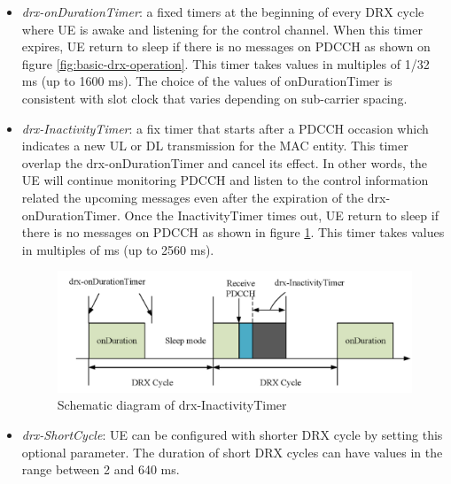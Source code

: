 \documentclass[conference]{IEEEtran}
\begin{document}
\begin{itemize}
    \item \textit{drx-onDurationTimer}: a fixed timers at the beginning of every DRX cycle where UE is awake and listening for the control channel. When this timer expires, UE return to sleep if there is no messages on PDCCH as shown on figure \ref{fig:basic-drx-operation}. This timer takes values in multiples of 1/32 ms (up to 1600 ms). The choice of the values of onDurationTimer is consistent with slot clock that varies depending on sub-carrier spacing.
    \item \textit{drx-InactivityTimer}: a fix timer that starts after a PDCCH occasion which indicates a new UL or DL transmission for the MAC entity. This timer overlap the drx-onDurationTimer and cancel its effect. In other words, the UE will continue monitoring PDCCH and listen to the control information related the upcoming messages even after the expiration of  the drx-onDurationTimer. Once the InactivityTimer times out, UE return to sleep if there is no messages on PDCCH as shown in figure \ref{fig:5g-drx-InactivityTimer}. This timer takes values in multiples of ms (up to 2560 ms).
\begin{figure}
    \centering
    \includegraphics[width=\linewidth]{Pictures/Schematic diagram of drx-InactivityTimer.png}
    \caption{Schematic diagram of drx-InactivityTimer}
    \label{fig:5g-drx-InactivityTimer}
\end{figure}

    \item \textit{drx-ShortCycle}: UE can be configured with shorter DRX cycle by setting this optional parameter. The duration of short DRX cycles can have values in the range between 2 and 640 ms.
    

\end{itemize}
\end{document}
